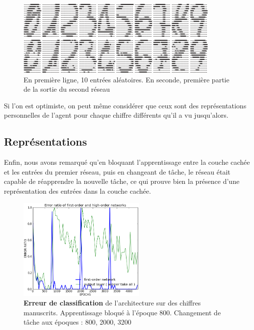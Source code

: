 \documentclass[a4paper,12pt, twoside]{article}
\begin{document}
\begin{figure}[H]
\begin{center}
 \includegraphics[height=140px]{metarepre.png}
\end{center}
\caption{ En première ligne, 10 entrées aléatoires. En seconde, première partie de la sortie du second réseau}
\end{figure}

Si l'on est optimiste, on peut même considérer que ceux sont des représentations personnelles de 
l'agent pour chaque chiffre différents qu'il a vu jusqu'alors.


\subsection{Représentations}

Enfin, nous avons remarqué qu'en bloquant l'apprentissage entre la couche cachée et les 
entrées du premier réseau, puis en changeant de tâche, le réseau était capable de réapprendre
la nouvelle tâche, ce qui prouve bien la présence d'une représentation des entrées dans la couche 
cachée.

\begin{figure}[H]
\begin{center}
 \includegraphics[height=190px]{../cleeremans_2007/digit_reco/err_handwritten_relearn_2.png}
\end{center}
\caption{ \textbf{Erreur de classification} de l'architecture sur des chiffres manuscrits.
Apprentissage bloqué à l'époque 800. Changement de tâche aux époques : 800, 2000, 3200}
\end{figure}
\end{document}
